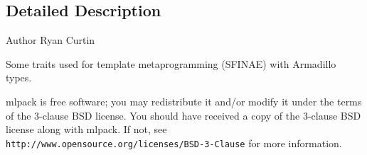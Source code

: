 \subsection{Detailed Description}
\begin{DoxyAuthor}{Author}
Ryan Curtin
\end{DoxyAuthor}
Some traits used for template metaprogramming (S\+F\+I\+N\+AE) with Armadillo types.

mlpack is free software; you may redistribute it and/or modify it under the terms of the 3-\/clause B\+SD license. You should have received a copy of the 3-\/clause B\+SD license along with mlpack. If not, see {\tt http\+://www.\+opensource.\+org/licenses/\+B\+S\+D-\/3-\/\+Clause} for more information. 